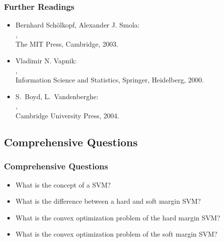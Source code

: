 \begin{frame}
  \frametitle{Further Readings}

  \begin{itemize}
    \item Bernhard Sch{\"o}lkopf, Alexander J. Smola: \\
      , \\
      The MIT Press, Cambridge, 2003. \\[.15cm]
    \item Vladimir N. Vapnik: \\
      , \\
      Information Science and Statistics, Springer, Heidelberg, 2000. \\[.15cm]
    \item S.~Boyd, L.~Vandenberghe: \\
      , \\
      Cambridge University Press, 2004. \\
  \end{itemize}
\end{frame}


\subsection{Comprehensive Questions}

\begin{frame}
  \frametitle{Comprehensive Questions}

  \begin{itemize}
    \item What is the concept of a SVM? \\[1cm]
    \item What is the difference between a hard and soft margin SVM? \\[1cm]
    \item What is the convex optimization problem of the hard margin SVM? \\[1cm]
    \item What is the convex optimization problem of the soft margin SVM?
  \end{itemize}
\end{frame}
